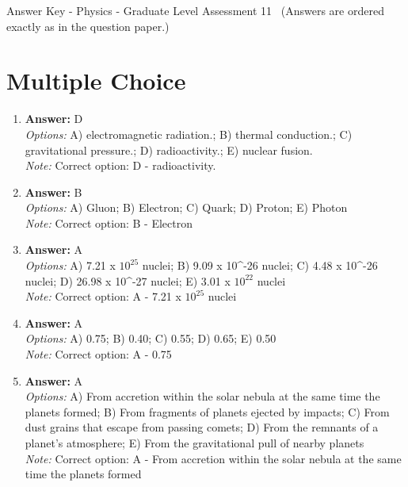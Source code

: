 \documentclass[12pt]{article}
\begin{document}
\begin{center}
Answer Key - Physics - Graduate Level Assessment 11 \
\small (Answers are ordered exactly as in the question paper.)
\end{center}

\section*{Multiple Choice}
\begin{enumerate}[label=\arabic*.]
\item \textbf{Answer:} D
\\ \textit{Options:} A) electromagnetic radiation.; B) thermal conduction.; C) gravitational pressure.; D) radioactivity.; E) nuclear fusion.
\\ \textit{Note:} Correct option: D - radioactivity.
\item \textbf{Answer:} B
\\ \textit{Options:} A) Gluon; B) Electron; C) Quark; D) Proton; E) Photon
\\ \textit{Note:} Correct option: B - Electron
\item \textbf{Answer:} A
\\ \textit{Options:} A) 7.21 x $10^25$ nuclei; B) 9.09 x 10^-26 nuclei; C) 4.48 x 10^-26 nuclei; D) 26.98 x 10^-27 nuclei; E) 3.01 x $10^22$ nuclei
\\ \textit{Note:} Correct option: A - 7.21 x $10^25$ nuclei
\item \textbf{Answer:} A
\\ \textit{Options:} A) 0.75; B) 0.40; C) 0.55; D) 0.65; E) 0.50
\\ \textit{Note:} Correct option: A - 0.75
\item \textbf{Answer:} A
\\ \textit{Options:} A) From accretion within the solar nebula at the same time the planets formed; B) From fragments of planets ejected by impacts; C) From dust grains that escape from passing comets; D) From the remnants of a planet's atmosphere; E) From the gravitational pull of nearby planets
\\ \textit{Note:} Correct option: A - From accretion within the solar nebula at the same time the planets formed
\end{enumerate}
\end{document}
